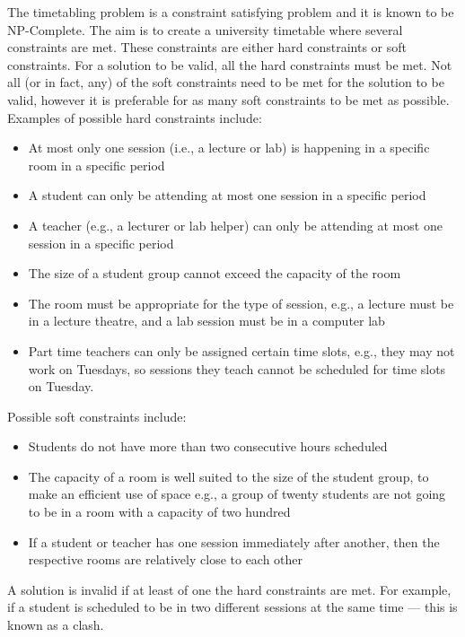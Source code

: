 \documentclass[a4paper, 12pt]{report}
\begin{document}
The timetabling problem is a constraint satisfying problem and it is known to
be NP-Complete.
The aim is to create a university timetable where several constraints are met.
These constraints are either hard constraints or soft constraints.
For a solution to be valid, all the hard constraints must be met.
Not all (or in fact, any) of the soft constraints need to be met for the
solution to be valid, however it is preferable for as many soft constraints to
be met as possible.
Examples of possible hard constraints include:

\begin{itemize}
	\item At most only one session (i.e., a lecture or lab) is happening in a 
		specific room in a specific period
	\item A student can only be attending at most one session in a specific 
		period
	\item A teacher (e.g., a lecturer or lab helper) can only be attending at 
		most one session in a specific period
	\item The size of a student group cannot exceed the capacity of the room
	\item The room must be appropriate for the type of session, e.g., a lecture 
		must be in a lecture theatre, and a lab session must be in a computer 
		lab
	\item Part time teachers can only be assigned certain time slots, e.g., they
		may not work on Tuesdays, so sessions they teach cannot be scheduled
		for time slots on Tuesday.
\end{itemize}

Possible soft constraints include:

\begin{itemize}
	\item Students do not have more than two consecutive hours scheduled
	\item The capacity of a room is well suited to the size of the student
		group, to make an efficient use of space e.g., a group of twenty
		students are not going to be in a room with a capacity of two hundred
	\item If a student or teacher has one session immediately after another,
		then the respective rooms are relatively close to each other
\end{itemize}

A solution is invalid if at least of one the hard constraints are met.
For example, if a student is scheduled to be in two different sessions at the
same time --- this is known as a clash.
\end{document}
